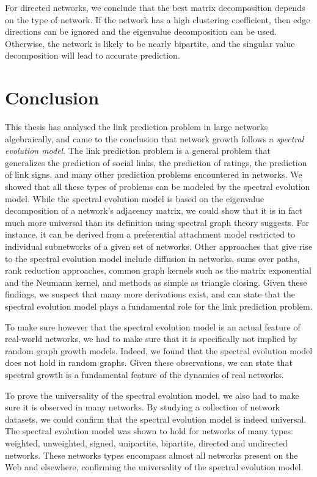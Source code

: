\documentclass[11pt,a4paper]{book}
\begin{document}
For directed networks, we conclude that the best matrix
decomposition depends on the type of network.  If the network has a high
clustering coefficient, then edge directions can be ignored and the
eigenvalue decomposition can be used.  Otherwise, the network is likely
to be nearly bipartite, and the singular value decomposition will lead
to accurate prediction. 

\chapter{Conclusion}
This thesis has analysed the link prediction problem in large networks
algebraically, and came to the conclusion that network growth follows a
\emph{spectral evolution model}.  
The link prediction problem is a general problem that generalizes the
prediction of social links, the prediction of ratings, the prediction of
link signs, and many other prediction problems encountered in
networks. 
We showed that all these types of problems can be modeled by the
spectral evolution model.  
While the spectral evolution model is based on the eigenvalue
decomposition of a network's adjacency matrix, we could show that it is
in fact much more universal than its definition using spectral graph
theory suggests.  For instance, it can be derived from a preferential
attachment model restricted to individual subnetworks of a given set of
networks.  Other approaches that give rise to the spectral evolution
model include diffusion in networks, sums over paths, rank reduction
approaches, common graph kernels such as the matrix exponential and the
Neumann kernel, and methods as simple as triangle closing.  Given these
findings, we suspect that many more derivations exist, and can state
that the spectral evolution model plays a fundamental role for the link
prediction problem.  

To make sure however that the spectral evolution model is an actual
feature of real-world networks, we had to make sure that it is
specifically not implied by random graph growth models.  Indeed, we
found that the spectral evolution model does not hold in random graphs.  Given
these observations, we can state that spectral growth is a fundamental
feature of the dynamics of real networks. 

To prove the universality of the spectral evolution model, we also had
to make sure it is observed in many networks.  By studying a collection of
network datasets, we could confirm that the spectral
evolution model is indeed universal.  The spectral evolution model was
shown to hold for networks of many types:  weighted, unweighted, signed,
unipartite, bipartite, directed and undirected networks.  These networks
types encompass almost all networks present on the Web and elsewhere,
confirming the universality of the spectral evolution model. 
\end{document}
